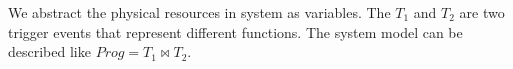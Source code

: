 We abstract the physical resources in system as variables. The $T_1$ and $T_2$ are two  trigger events that represent different functions. The system model can be described like $Prog = T_{1} \bowtie T_{2}$.



%
%
%
%
%
